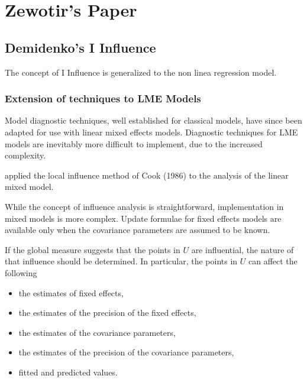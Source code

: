 \documentclass[12pt, a4paper]{article}
\begin{document}
\chapter{Zewotir's Paper}
	




\section{Demidenko's I Influence} %
The concept of I Influence is generalized  to the non linea regression model.


\subsection{Extension of techniques to LME Models} %

Model diagnostic techniques, well established for classical models, have since been adapted for use with linear mixed effects models. Diagnostic techniques for LME models are inevitably more difficult to implement, due to the increased complexity.

\citet{Beckman} applied the local influence method of Cook (1986) to the analysis of the linear mixed model.

While the concept of influence analysis is straightforward, implementation in mixed models is more complex. Update formulae for fixed effects models are available only when the covariance parameters are assumed to be known.

If the global measure suggests that the points in $U$ are influential, the nature of that influence should be determined. In particular, the points in $U$ can affect the following

\begin{itemize}
	\item the estimates of fixed effects,
	\item the estimates of the precision of the fixed effects,
	\item the estimates of the covariance parameters,
	\item the estimates of the precision of the covariance parameters,
	\item fitted and predicted values.
\end{itemize}
\end{document}
